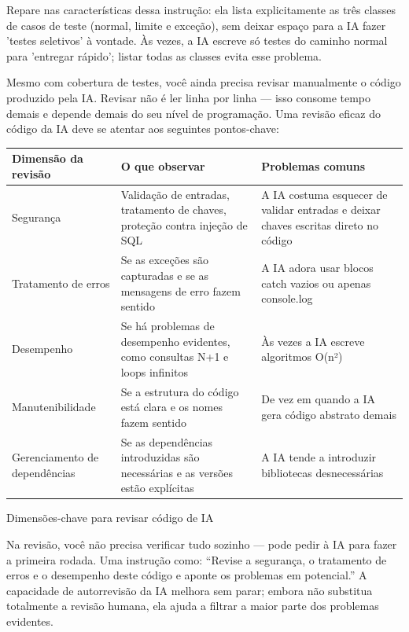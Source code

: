 Repare nas características dessa instrução: ela lista explicitamente as três classes de casos de teste (normal, limite e exceção), sem deixar espaço para a IA fazer 'testes seletivos' à vontade. Às vezes, a IA escreve só testes do caminho normal para 'entregar rápido'; listar todas as classes evita esse problema.


Mesmo com cobertura de testes, você ainda precisa revisar manualmente o código produzido pela IA. Revisar não é ler linha por linha — isso consome tempo demais e depende demais do seu nível de programação. Uma revisão eficaz do código da IA deve se atentar aos seguintes pontos-chave:

\begin{center}
\begin{tabularx}{\linewidth}{|X|X|X|}
\hline
\textbf{Dimensão da revisão} & \textbf{O que observar} & \textbf{Problemas comuns} \tabularnewline
\hline
Segurança & Validação de entradas, tratamento de chaves, proteção contra injeção de SQL & A IA costuma esquecer de validar entradas e deixar chaves escritas direto no código \tabularnewline
Tratamento de erros & Se as exceções são capturadas e se as mensagens de erro fazem sentido & A IA adora usar blocos catch vazios ou apenas console.log \tabularnewline
Desempenho & Se há problemas de desempenho evidentes, como consultas N+1 e loops infinitos & Às vezes a IA escreve algoritmos O(n²) \tabularnewline
Manutenibilidade & Se a estrutura do código está clara e os nomes fazem sentido & De vez em quando a IA gera código abstrato demais \tabularnewline
Gerenciamento de dependências & Se as dependências introduzidas são necessárias e as versões estão explícitas & A IA tende a introduzir bibliotecas desnecessárias \tabularnewline
\hline
\end{tabularx}
\end{center}

\begin{center}\small\color{gray}Dimensões-chave para revisar código de IA\end{center}

Na revisão, você não precisa verificar tudo sozinho — pode pedir à IA para fazer a primeira rodada. Uma instrução como: “Revise a segurança, o tratamento de erros e o desempenho deste código e aponte os problemas em potencial.” A capacidade de autorrevisão da IA melhora sem parar; embora não substitua totalmente a revisão humana, ela ajuda a filtrar a maior parte dos problemas evidentes.

